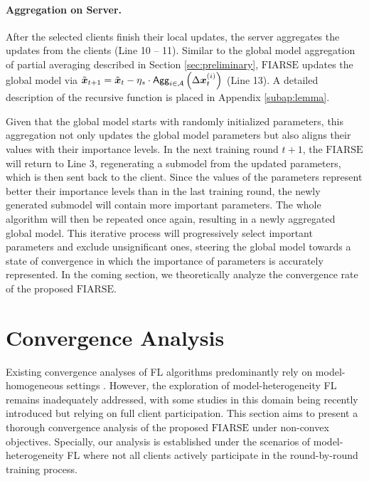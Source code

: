 \documentclass{article}
\renewcommand{\cite}{\citep}
\theoremstyle{plain}
\theoremstyle{definition}
\theoremstyle{remark}
\newcommand{\algo}{\ensuremath{\text{FIARSE}}\xspace}
\newcommand{\bracket}[1]{\left(#1\right)}
\begin{document}
\paragraph{Aggregation on Server.} After the selected clients finish their local updates, the server aggregates the updates from the clients (Line 10 -- 11). Similar to the global model aggregation of partial averaging described in Section \ref{sec:preliminary}, \algo updates the global model via $\x{t+1} = \x{t} - \eta_s \cdot \textsf{Agg}_{i\in\mathcal{A}}\bracket{\Delta\x{i}{t}}$ (Line 13). A detailed description of the recursive function is placed in Appendix \ref{subap:lemma}. 

Given that the global model starts with randomly initialized parameters, this aggregation not only updates the global model parameters but also aligns their values with their importance levels. In the next training round $t+1$, the \algo will return to Line 3, regenerating a submodel from the updated parameters, which is then sent back to the client. Since the values of the parameters represent better their importance levels than in the last training round, the newly generated submodel will contain more important parameters. The whole algorithm will then be repeated once again, resulting in a newly aggregated global model. This iterative process will progressively select important parameters and exclude unsignificant ones, steering the global model towards a state of convergence in which the importance of parameters is accurately represented. In the coming section, we theoretically analyze the convergence rate of the proposed \algo. 

\section{Convergence Analysis} \label{sec:convergence} 

Existing convergence analyses of FL algorithms predominantly rely on model-homogeneous settings \cite{wang2021field}. However, the exploration of model-heterogeneity FL remains inadequately addressed, with some studies \cite{zhou2023every, shulgin2023towards, wang2023theoretical, yi2024fedp} in this domain being recently introduced but relying on full client participation. This section aims to present a thorough convergence analysis of the proposed \algo under non-convex objectives. Specially, our analysis is established under the scenarios of model-heterogeneity FL where not all clients actively participate in the round-by-round training process.
\end{document}

